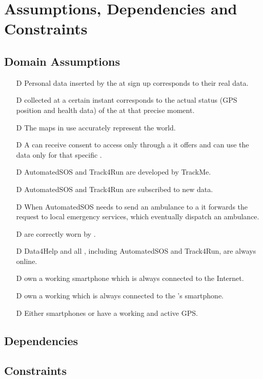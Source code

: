 \documentclass[../../rasd.tex]{subfiles}
\begin{document}
\section{Assumptions, Dependencies and Constraints}
	\subsection{Domain Assumptions}
	 	\begin{itemize}
		 	\item[D\subs{1}]Personal data inserted by the  at sign up corresponds to their real data.
			\item[D\subs{2}] collected at a certain instant corresponds to the actual status (GPS position and health data) of the  at that precise moment.				
			\item[D\subs{3}]The maps in use accurately represent the world.
			\item[D\subs{4}]A  can receive consent to  access only through a  it offers and can use the data only for that specific .
			\item[D\subs{5}]AutomatedSOS and Track4Run are  developed by TrackMe.
			\item[D\subs{6}]AutomatedSOS and Track4Run are subscribed to new data.
			\item[D\subs{7}]When AutomatedSOS needs to send an ambulance to a  it forwards the request to local emergency services, which eventually dispatch an ambulance.
			\item[D\subs{8}] are correctly worn by .
			\item[D\subs{9}]Data4Help and all , including AutomatedSOS and Track4Run, are always online.
			\item[D\subs{10}] own a working smartphone which is always connected to the Internet.
			\item[D\subs{11}] own a working  which is always connected to the 's smartphone.
			\item[D\subs{12}]Either smartphones or  have a working and active GPS.
		\end{itemize}	
	\subsection{Dependencies}
	\subsection{Constraints}
\end{document}
